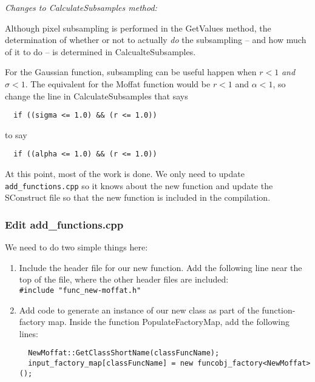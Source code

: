 \documentclass[10pt,a4paper,article]{memoir}
\begin{document}
\bigskip
\noindent \textit{Changes to CalculateSubsamples method:}
\smallskip

Although pixel subsampling is performed in the GetValues method, the
determination of whether or not to actually \textit{do} the subsampling
-- and how much of it to do -- is determined in CalcualteSubsamples.

For the Gaussian function, subsampling can be useful
happen when $r < 1$ \textit{and} $\sigma < 1$. The equivalent
for the Moffat function would be $r < 1$ and $\alpha < 1$, so
change the line in CalculateSubsamples that says
\begin{verbatim}
  if ((sigma <= 1.0) && (r <= 1.0))
\end{verbatim}
to say
\begin{verbatim}
  if ((alpha <= 1.0) && (r <= 1.0))
\end{verbatim}


\bigskip


At this point, most of the work is done.  We only need to update
\texttt{add\_functions.cpp} so it knows about the new function and
update the SConstruct file so that the new function is included in the
compilation.


\subsubsection{Edit add\_functions.cpp}

We need to do two simple things here:
\begin{enumerate}
\item Include the header file for our new function. Add the following line near
the top of the file, where the other header files are included:\\
\texttt{\#include "func\_new-moffat.h"}

\item Add code to generate an instance of our new class as part of the
function-factory map. Inside the function PopulateFactoryMap, add the following lines:
\begin{verbatim}
  NewMoffat::GetClassShortName(classFuncName);
  input_factory_map[classFuncName] = new funcobj_factory<NewMoffat>();
\end{verbatim}

\end{enumerate}
\end{document}
